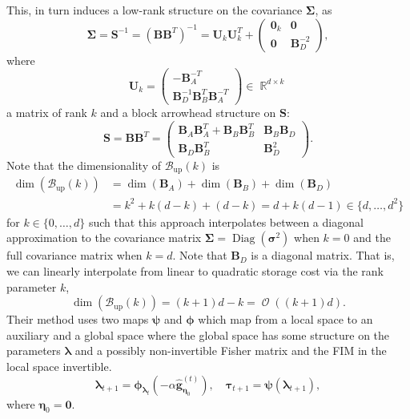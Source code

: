 \documentclass[a4paper, 11pt, oneside]{scrartcl}
\theoremstyle{break}
\DeclareMathOperator{\Real}{\mathbb{R}}
\DeclareMathOperator{\Diag}{Diag}
\DeclareMathOperator{\BigO}{\mathcal{O}}
\newcommand{\matr}[1]{\boldsymbol{#1}}
\newcommand{\set}[1]{\mathcal{#1}}
\numberwithin{equation}{section}
\begin{document}
				This, in turn induces a low-rank structure on the covariance $\matr{\Sigma}$, as 
				$$\matr{\Sigma} = \matr{S}^{-1} = (\matr{B} \matr{B}^T)^{-1} = \matr{U}_k \matr{U}_k^T + \begin{pmatrix} \matr{0}_k & \matr{0} \\ \matr{0} & \matr{B}_D^{-2}\end{pmatrix},$$
				where 
				$$\matr{U}_k = \begin{pmatrix} -\matr{B}_A^{-T} \\ \matr{B}_D^{-1} \matr{B}_B^T \matr{B}_A^{-T}\end{pmatrix} \in \Real^{d \times k}$$
				a matrix of rank $k$ and a block arrowhead structure on $\matr{S}$:
				$$\matr{S} = \matr{B} \matr{B}^T = \begin{pmatrix} \matr{B}_A \matr{B}_A^T + \matr{B}_B \matr{B}_B^T & \matr{B}_B \matr{B}_D \\ \matr{B}_D \matr{B}_B^T & \matr{B}_D^2 \end{pmatrix}.$$
				Note that the dimensionality of $\set{B}_{\text{up}}(k)$ is
				\begin{align*}
					\dim(\set{B}_{\text{up}}(k)) &= \dim (\matr{B}_A) + \dim (\matr{B}_B) + \dim (\matr{B}_D) \\
					&= k^2 + k (d - k) + (d - k) = d + k (d - 1) \in \{d, \dots, d^2\}
				\end{align*}
				for $k \in \{0, \dots, d\}$ such that this approach interpolates between a diagonal approximation to the covariance matrix $\matr{\Sigma} = \Diag(\matr{\sigma}^2)$ when $k = 0$ and the full covariance matrix when $k = d$.
				Note that $\matr{B}_D$ is a diagonal matrix.
				That is, we can linearly interpolate from linear to quadratic storage cost via the rank parameter $k$,
				\begin{equation*}
					\dim(\set{B}_{\text{up}}(k)) = (k + 1) d - k = \BigO ((k + 1) d).
				\end{equation*}
				Their method uses two maps $\matr{\psi}$ and $\matr{\phi}$ which map from a local space to an auxiliary and a global space where the global space has some structure on the parameters $\matr{\lambda}$ and a possibly non-invertible Fisher matrix and the FIM in the local space invertible. 
				$$\matr{\lambda}_{t+1} = \matr{\phi}_{\matr{\lambda}_t}(-\alpha \matr{\hat{g}}_{\matr{\eta}_0}^{(t)}), \quad \matr{\tau}_{t+1} = \matr{\psi} (\matr{\lambda}_{t+1}),$$
				where $\matr{\eta}_0 = \matr{0}$.
\end{document}
